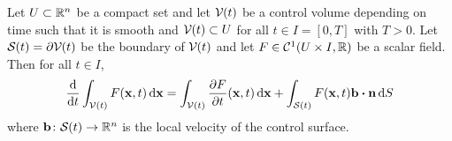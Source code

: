 \begin{theorem}
	Let $U \subset \mathbb{R}^n$ be a compact set and let $\mathcal{V}_{}(t)$ be a control volume depending on time such that it is smooth and $\mathcal{V}_{}(t) \subset U$ for all $t \in I = [0, T]$ with $T > 0$. Let $\mathcal{S}_{}(t) = \partial \mathcal{V}_{}(t)$ be the boundary of $\mathcal{V}_{}(t)$ and let $F \in \mathcal{C}^1(U \times I, \mathbb{R})$ be a scalar field. Then for all $t \in I$,
	\begin{equation} \label{eq:reynolds_transport_theorem}
		\frac{\dd}{\dd{t}} \int_\cvt F(\vb{x}, t) \dd{\vb{x}} = 
		\int_\cvt \frac{\partial F}{\partial t} (\vb{x}, t) \dd{\vb{x}} + 
		\int_\cst F(\vb{x}, t) \vb{b} \vdot \vb{n} \dd{S}
	\end{equation}
	where $\vb{b} \colon \mathcal{S}_{}(t) \rightarrow \mathbb{R}^n$ is the local velocity of the control surface.
\end{theorem}
